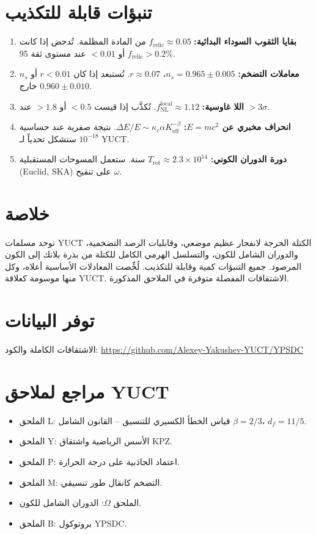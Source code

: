 \documentclass[12pt,a4paper]{article}
\begin{document}
	\section{تنبؤات قابلة للتكذيب}
	
	\begin{enumerate}
		\item \textbf{بقايا الثقوب السوداء البدائية:} \(f_{\mathrm{relic}} \approx 0.05\) من المادة المظلمة. تُدحض إذا كانت \(f_{\mathrm{relic}}>0.2\) أو \(<0.01\) عند مستوى ثقة 95\%.
		\item \textbf{معاملات التضخم:} \(n_s = 0.965\pm0.005\)، \(r\approx 0.07\). تُستبعد إذا كان \(r<0.01\) أو \(n_s\) خارج \(0.960\pm0.010\).
		\item \textbf{اللا غاوسية:} \(f_{\mathrm{NL}}^{\mathrm{local}} \approx 1.12\). تُكذَّب إذا قيست \(<0.5\) أو \(>1.8\) عند \(>3\sigma\).
		\item \textbf{انحراف مخبري عن \(E=mc^2\):} \(\Delta E/E \sim \kappa_c\alpha K_{\mathrm{eff}}^{-\beta}\). نتيجة صفرية عند حساسية \(10^{-18}\) ستشكل تحدياً لـ YUCT.
		\item \textbf{دورة الدوران الكوني:} \(T_{\mathrm{rot}} \approx 2.3\times10^{14}\) سنة. ستعمل المسوحات المستقبلية (Euclid, SKA) على تنقيح \(\omega\).
	\end{enumerate}
	
	\section{خلاصة}
	
	توحد مسلمات YUCT الكتلة الحرجة لانفجار عظيم موضعي، وقابليات الرصد التضخمية، والدوران الشامل للكون، والتسلسل الهرمي الكامل للكتلة من بذرة بلانك إلى الكون المرصود. جميع التنبؤات كمية وقابلة للتكذيب. لُخِّصت المعادلات الأساسية أعلاه، وكل منها موسومة كعلاقة YUCT. الاشتقاقات المفصلة متوفرة في الملاحق المذكورة.
	
	\section*{توفر البيانات}
	
	الاشتقاقات الكاملة والكود: \url{https://github.com/Alexey-Yakushev-YUCT/YPSDC}
	
	\section*{مراجع لملاحق YUCT}
	\begin{itemize}
		\item الملحق L: قياس الخطأ الكسيري للتنسيق – القانون الشامل \(\beta=2/3\)، \(d_f=11/5\).
		\item الملحق Y: الأسس الرياضية واشتقاق KPZ.
		\item الملحق P: اعتماد الجاذبية على درجة الحرارة.
		\item الملحق M: التضخم كانقال طور تنسيقي.
		\item الملحق \(\Omega\): الدوران الشامل للكون.
		\item الملحق B: بروتوكول YPSDC.
	\end{itemize}
	
\end{document}
